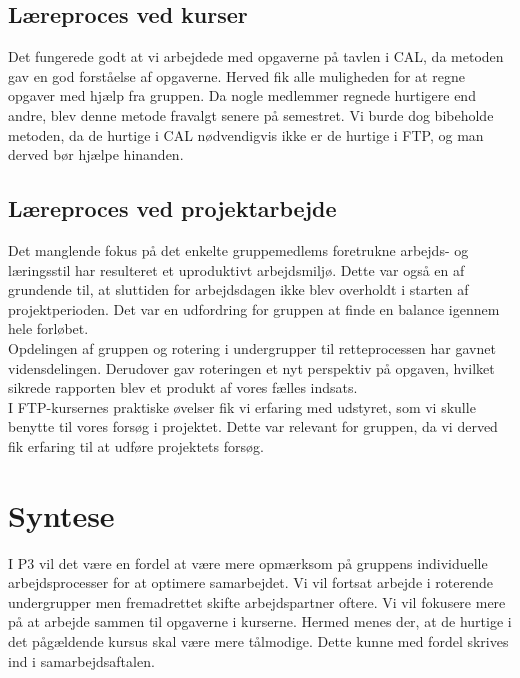 \subsection{Læreproces ved kurser}
Det fungerede godt at vi arbejdede med opgaverne på tavlen i CAL, da metoden gav en god forståelse af opgaverne. Herved fik alle muligheden for at regne opgaver med hjælp fra gruppen. Da nogle medlemmer regnede hurtigere end andre, blev denne metode fravalgt senere på semestret. Vi burde dog bibeholde metoden, da de hurtige i CAL nødvendigvis ikke er de hurtige i FTP, og man derved bør hjælpe hinanden. \\
 
\subsection{Læreproces ved projektarbejde}
Det manglende fokus på det enkelte gruppemedlems foretrukne arbejds- og læringsstil har resulteret et uproduktivt arbejdsmiljø. Dette var også en af grundende til, at sluttiden for arbejdsdagen ikke blev overholdt i starten af projektperioden. Det var en udfordring for gruppen at finde en balance igennem hele forløbet. \\
Opdelingen af gruppen og rotering i undergrupper til retteprocessen har gavnet vidensdelingen. Derudover gav roteringen et nyt perspektiv på opgaven, hvilket sikrede rapporten blev et produkt af vores fælles indsats. \\
I FTP-kursernes praktiske øvelser fik vi erfaring med udstyret, som vi skulle benytte til vores forsøg i projektet. Dette var relevant for gruppen, da vi derved fik erfaring til at udføre projektets forsøg.

\section{Syntese}
I P$3$ vil det være en fordel at være mere opmærksom på gruppens individuelle arbejdsprocesser for at optimere samarbejdet. Vi vil fortsat arbejde i roterende undergrupper men fremadrettet skifte arbejdspartner oftere.
Vi vil fokusere mere på at arbejde sammen til opgaverne i kurserne. Hermed menes der, at de hurtige i det pågældende kursus skal være mere tålmodige. Dette kunne med fordel skrives ind i samarbejdsaftalen.